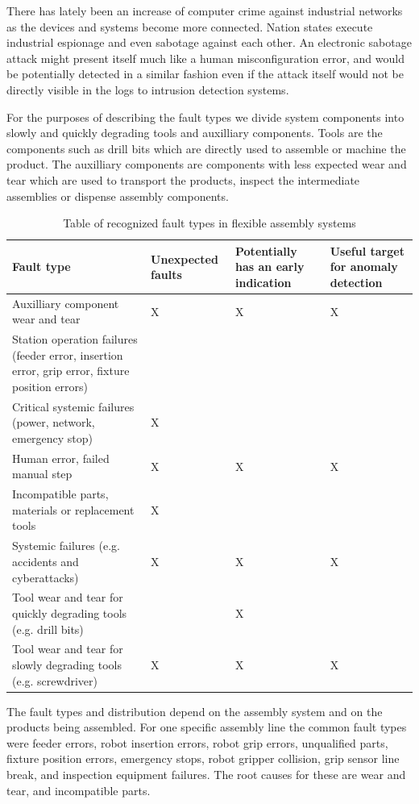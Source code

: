 \documentclass[procedia]{easychair}
\begin{document}
There has lately been an increase of computer crime against industrial networks as the devices and systems become more connected.
Nation states execute industrial espionage and even sabotage against each other\cite{stuxnet}. An electronic sabotage attack might present itself
much like a human misconfiguration error, and would be potentially detected in a similar fashion even if the attack itself would not be
directly visible in the logs to intrusion detection systems.

For the purposes of describing the fault types we divide system components into slowly and
quickly degrading tools and auxilliary components. Tools are the components such as drill bits which are directly used to assemble or
machine the product. The auxilliary components are components with less expected wear and tear which are used to transport the products,
inspect the intermediate assemblies or dispense assembly components.

\begin{table}[bt]
\tiny
\renewcommand{\arraystretch}{1.3}
\caption{Table of recognized fault types in flexible assembly systems}
\label{faults}
\centering
\begin{tabular}{|p{50mm}|p{25mm}|p{25mm}|p{25mm}|}
\hline
Fault type & Unexpected faults & Potentially has an early indication & Useful target for anomaly detection \\
\hline
\hline
Auxilliary component wear and tear & X & X & X \\
\hline
Station operation failures (feeder error, insertion error, grip error, fixture position errors) & & & \\
\hline
Critical systemic failures (power, network, emergency stop) & X & & \\
\hline
Human error, failed manual step & X & X & X \\
\hline
Incompatible parts, materials or replacement tools & X & & \\
\hline
Systemic failures (e.g. accidents and cyberattacks) & X & X & X \\
\hline
Tool wear and tear for quickly degrading tools (e.g. drill bits) & & X & \\
\hline
Tool wear and tear for slowly degrading tools (e.g. screwdriver) & X & X & X \\
\hline
\end{tabular}
\end{table}

The fault types and distribution depend on the assembly system
and on the products being assembled. For one
specific assembly line \cite{cong1997fault} the common fault types were feeder errors, robot insertion errors,
robot grip errors, unqualified parts, fixture position errors, emergency stops, robot gripper collision,
grip sensor line break, and inspection equipment failures. The root causes for these are wear and tear, and incompatible parts.
\end{document}
